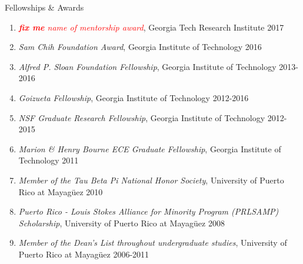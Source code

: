 \documentclass{resume} %
\newcommand{\simplelistentry}[3]{\textit{#1}, {#2} \hfill {#3}}
\newcommand{\fixme}{\textcolor{red}{\textbf{fix me}} \space}
\newcommand{\attention}[1]{\noindent \fixme \textcolor{red}{#1}}
\begin{document}
\begin{rSection}{Fellowships \& Awards}

\begin{enumerate}

\item \simplelistentry{\attention{name of mentorship award}}{Georgia Tech
    Research Institute}{2017}

\item \simplelistentry{Sam Chih Foundation Award}{Georgia Institute of
    Technology}{2016}

\item \simplelistentry{Alfred P. Sloan Foundation Fellowship}{Georgia Institute
    of Technology}{2013-2016}

\item \simplelistentry{Goizueta Fellowship}{Georgia Institute of
    Technology}{2012-2016}

\item \simplelistentry{NSF Graduate Research Fellowship}{Georgia Institute of
    Technology}{2012-2015}

\item \simplelistentry{Marion \& Henry Bourne ECE Graduate Fellowship}{Georgia
    Institute of Technology}{2011}

\item \simplelistentry{Member of the Tau Beta Pi National Honor
    Society}{University of Puerto Rico at Mayag\"{u}ez}{2010}

\item \simplelistentry{Puerto Rico - Louis Stokes Alliance for Minority Program
    (PRLSAMP) Scholarship}{University of Puerto Rico at Mayag\"{u}ez}{2008}

\item \simplelistentry{Member of the Dean's List throughout undergraduate
    studies}{University of Puerto Rico at Mayag\"{u}ez}{2006-2011}

\end{enumerate}

\end{rSection}







\end{document}
